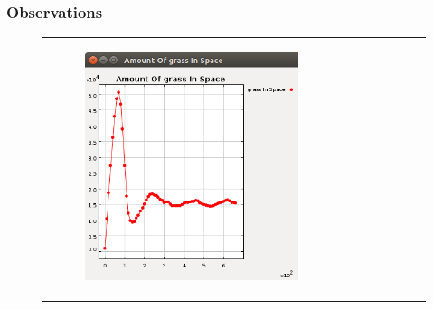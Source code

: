 \documentclass[11pt]{article}
\begin{document}
\subsubsection{Observations}
\begin{figure}

    \begin{adjustbox}{width=\textwidth,center}
    \begin{tabular}{c c}
         \begin{subfigure}[b]{\textwidth}
        \includegraphics[width=\textwidth]{experiment/1/Grass.png}
        \caption{\label{img:grass1} }
    \end{subfigure} & 
    \begin{subfigure}[b]{\textwidth}

\end{subfigure}
\end{tabular}
\end{adjustbox}
\end{figure}
\end{document}
